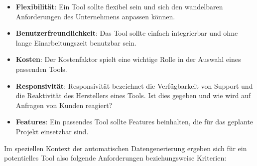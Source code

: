 \begin{itemize}
    \item \textbf{Flexibilität}: Ein Tool sollte flexibel sein und sich den wandelbaren Anforderungen des Unternehmens anpassen können.
    \item \textbf{Benutzerfreundlichkeit}: Das Tool sollte einfach integrierbar und ohne lange Einarbeitungszeit benutzbar sein.
    \item \textbf{Kosten}: Der Kostenfaktor spielt eine wichtige Rolle in der Auswahl eines passenden Tools.
    \item \textbf{Responsivität}: Responsivität bezeichnet die Verfügbarkeit von Support und die Reaktivität des Herstellers eines Tools. Ist dies gegeben und wie wird auf Anfragen von Kunden reagiert?
    \item \textbf{Features}: Ein passendes Tool sollte Features beinhalten, die für das geplante Projekt einsetzbar sind.
\end{itemize}
\cite{taheri:2015}

Im speziellen Kontext der automatischen Datengenerierung ergeben sich für ein potentielles Tool also folgende Anforderungen beziehungsweise Kriterien:

